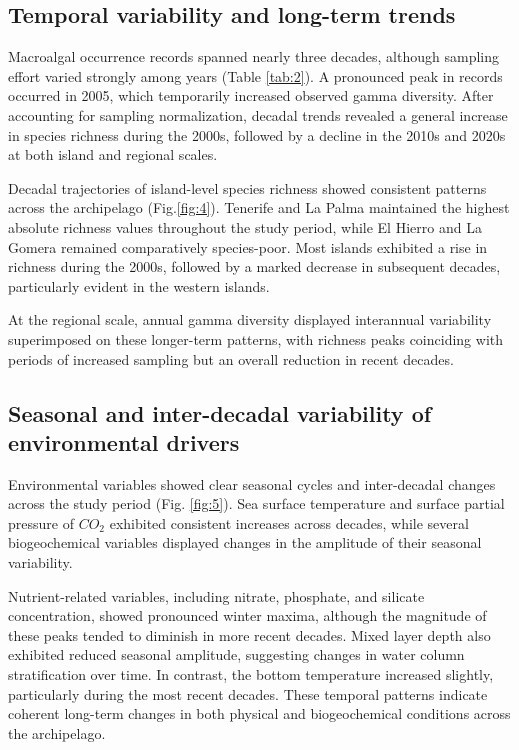 \documentclass[a4paper,fleqn]{cas-sc}
\begin{document}
\subsection{Temporal variability and long-term trends}

Macroalgal occurrence records spanned nearly three decades, although sampling effort varied strongly among years (Table \ref{tab:2}). A pronounced peak in records occurred in 2005, which temporarily increased observed gamma diversity. After accounting for sampling normalization, decadal trends revealed a general increase in species richness during the 2000s, followed by a decline in the 2010s and 2020s at both island and regional scales.

Decadal trajectories of island-level species richness showed consistent patterns across the archipelago (Fig.\ref{fig:4}). Tenerife and La Palma maintained the highest absolute richness values throughout the study period, while El Hierro and La Gomera remained comparatively species-poor. Most islands exhibited a rise in richness during the 2000s, followed by a marked decrease in subsequent decades, particularly evident in the western islands.

At the regional scale, annual gamma diversity displayed interannual variability superimposed on these longer-term patterns, with richness peaks coinciding with periods of increased sampling but an overall reduction in recent decades.

\subsection{Seasonal and inter-decadal variability of environmental drivers}

Environmental variables showed clear seasonal cycles and inter-decadal changes across the study period (Fig. \ref{fig:5}). Sea surface temperature and surface partial pressure of $CO_{2}$ exhibited consistent increases across decades, while several biogeochemical variables displayed changes in the amplitude of their seasonal variability. 

Nutrient-related variables, including nitrate, phosphate, and silicate concentration, showed pronounced winter maxima, although the magnitude of these peaks tended to diminish in more recent decades. Mixed layer depth also exhibited reduced seasonal amplitude, suggesting changes in water column stratification over time. In contrast, the bottom temperature increased slightly, particularly during the most recent decades. These temporal patterns indicate coherent long-term changes in both physical and biogeochemical conditions across the archipelago.
\end{document}
